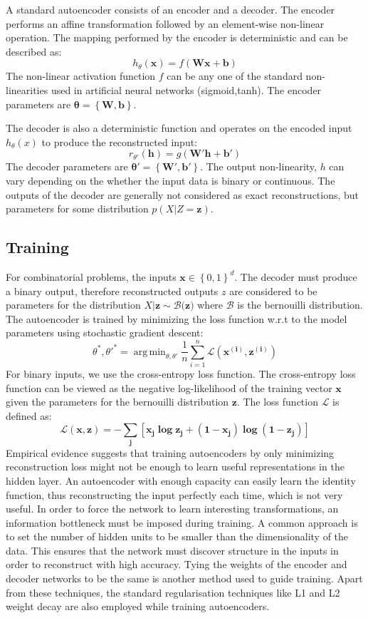 \documentclass[runningheads,a4paper]{llncs}
\DeclareMathOperator*{\argmin}{arg\,min}
\begin{document}
A standard autoencoder consists of an encoder and a decoder. The encoder performs an affine transformation followed by an element-wise non-linear operation. The mapping performed by the encoder is deterministic and can be described as: $$h_{\theta}(\mathbf{x}) = f(\mathbf{Wx + b})$$ The non-linear activation function $f$ can be any one of the standard non-linearities used in artificial neural networks (sigmoid,tanh). The encoder parameters are $\mathbf{\theta = \left\{ W,b \right\}}$. 

The decoder is also a deterministic function and operates on the encoded input $h_{\theta}(x)$ to produce the reconstructed input: $$ r_{\theta'}(\mathbf{h}) = g(\mathbf{W'h + b'})$$ 
The decoder parameters are $\mathbf{\theta' = \left\{ W',b' \right\}}$. The output non-linearity, $h$ can vary depending on the whether the input data is binary or continuous. The outputs of the decoder are generally not considered as exact reconstructions, but parameters for some distribution $p(X|Z=\mathbf{z})$. 

\subsection{Training}

For combinatorial problems, the inputs $\mathbf{x} \in \left\{ 0,1 \right\}^d$. The decoder must produce a binary output, therefore reconstructed outputs $z$ are considered to be parameters for the distribution  $X|\mathbf{z} \sim \mathcal{B(\mathbf{z}})$ where $\mathcal{B}$ is the bernouilli distribution. The autoencoder is trained by minimizing the loss function w.r.t to the model parameters using stochastic gradient descent:
$$ \theta^{*},\theta'^{*} = \argmin_{\theta,\theta'}{\frac{1}{n}}\sum_{i=1}^{n}\mathcal{L}(\mathbf {x^{(i)},z^{(i)}})$$
For binary inputs, we use the cross-entropy loss function. The cross-entropy loss function can be viewed as the negative log-likelihood of the training vector $\mathbf{x}$ given the parameters for the bernouilli distribution $\mathbf{z}$. The loss function $\mathcal{L}$ is defined as:
$$ \mathbf{\mathcal{L}(x,z) = -\sum_{j}[x_{j} \log z_{j} + (1 - x_{j})\log {(1-z_{j})}]}$$ 
Empirical evidence suggests that training autoencoders by only minimizing reconstruction loss might not be enough to learn useful representations in the hidden layer. An autoencoder with enough capacity can easily learn the identity function, thus reconstructing the input perfectly each time, which is not very useful. In order to force the network to learn interesting transformations, an information bottleneck must be imposed during training. A common approach is to set the number of hidden units to be smaller than the dimensionality of the data. This ensures that the network must discover structure in the inputs in order to reconstruct with high accuracy. Tying the weights of the encoder and decoder networks to be the same is another method used to guide training. Apart from these techniques, the standard regularisation techniques like L1 and L2 weight \cite{bishop1995neural} decay are also employed while training autoencoders. 
\end{document}
